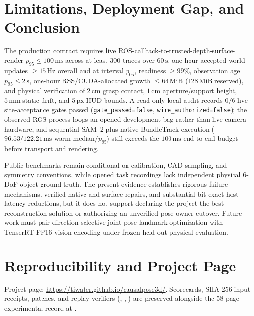 \documentclass[10pt,journal]{IEEEtran}
\begin{document}
\section{Limitations, Deployment Gap, and Conclusion}
\label{sec:limitations}

The production contract requires live ROS-callback-to-trusted-depth-surface-render $p_{95}\le 100\,\mathrm{ms}$ across at least $300$ traces over $60\,\mathrm{s}$, one-hour accepted world updates $\ge 15\,\mathrm{Hz}$ overall and at interval $p_{05}$, readiness $\ge 99\%$, observation age $p_{95}\le 2\,\mathrm{s}$, one-hour RSS/CUDA-allocated growth $\le 64\,\mathrm{MiB}$ ($128\,\mathrm{MiB}$ reserved), and physical verification of $2\,\mathrm{cm}$ grasp contact, $1\,\mathrm{cm}$ aperture/support height, $5\,\mathrm{mm}$ static drift, and $5\,\mathrm{px}$ HUD bounds. A read-only local audit records $0/6$ live site-acceptance gates passed (\texttt{gate\_passed=false}, \texttt{wire\_authorized=false}); the observed ROS process loops an opened development bag rather than live camera hardware, and sequential SAM~2 plus native BundleTrack execution ($96.53/122.21\,\mathrm{ms}$ warm median/$p_{95}$) still exceeds the $100\,\mathrm{ms}$ end-to-end budget before transport and rendering.

Public benchmarks remain conditional on calibration, CAD sampling, and symmetry conventions, while opened task recordings lack independent physical 6-DoF object ground truth. The present evidence establishes rigorous failure mechanisms, verified native and surface repairs, and substantial bit-exact host latency reductions, but it does not support declaring the project the best reconstruction solution or authorizing an unverified pose-owner cutover. Future work must pair direction-selective joint pose-landmark optimization with TensorRT FP16 vision encoding under frozen held-out physical evaluation.

\section*{Reproducibility and Project Page}
Project page: \url{https://tiwater.github.io/causalpose3d/}. Scorecards, SHA-256 input receipts, patches, and replay verifiers (, , ) are preserved alongside the 58-page experimental record at .
\end{document}
